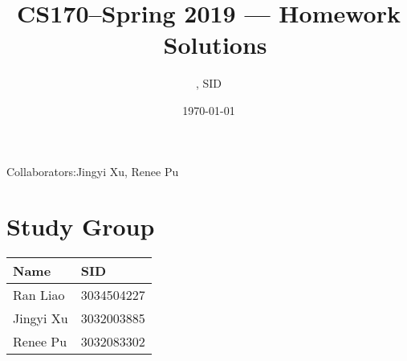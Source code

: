 \documentclass[11pt]{article}
\title{CS170--Spring 2019 --- Homework \Homework\ Solutions}
\author{\Name, SID \SID}
\date{\today}
\begin{document}
\maketitle
Collaborators:Jingyi Xu, Renee Pu

\section{Study Group}
	\begin{tabular}{ll}
		Name		&   SID         		\\\hline
		Ran Liao		&   3034504227  	\\  
		Jingyi Xu		&   3032003885  	\\
		Renee Pu		&   3032083302  	\\
	\end{tabular}

	



\newpage
\end{document}
